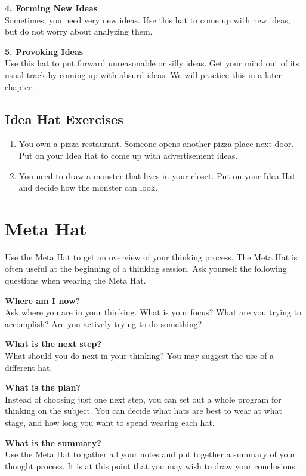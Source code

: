 \textbf{4. Forming New Ideas} \\
Sometimes, you need very new ideas. Use this hat to come up with new ideas, but do not worry about analyzing them.

\textbf{5. Provoking Ideas} \\
Use this hat to put forward unreasonable or silly ideas. Get your mind out of its usual track by coming up with absurd ideas. We will practice this in a later chapter.

\subsection*{Idea Hat Exercises}
\begin{enumerate}
	\item You own a pizza restaurant. Someone opens another pizza place next door. Put on your Idea Hat to come up with advertisement ideas.
	\item You need to draw a monster that lives in your closet. Put on your Idea Hat and decide how the monster can look.
\end{enumerate}

\section*{Meta Hat}
Use the Meta Hat to get an overview of your thinking process. The Meta Hat is often useful at the beginning of a thinking session. Ask yourself the following questions when wearing the Meta Hat.

\textbf{Where am I now?} \\
Ask where you are in your thinking. What is your focus? What are you trying to accomplish? Are you actively trying to do something?

\textbf{What is the next step?} \\
What should you do next in your thinking? You may suggest the use of a different hat.

\textbf{What is the plan?} \\
Instead of choosing just one next step, you can set out a whole program for thinking on the subject. You can decide what hats are best to wear at what stage, and how long you want to spend wearing each hat.

\textbf{What is the summary?} \\
Use the Meta Hat to gather all your notes and put together a summary of your thought process. It is at this point that you may wish to draw your conclusions.

